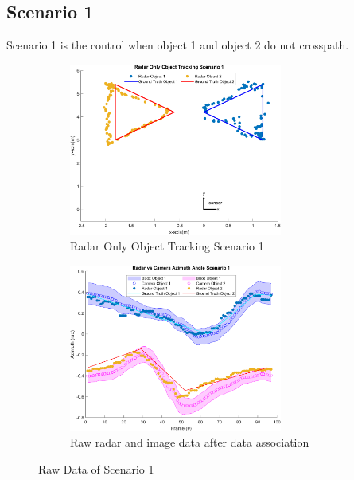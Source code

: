 \subsection{Scenario 1}\label{sec:3-exp_result1}
Scenario 1 is the control when object 1 and object 2 do not crosspath.
\begin{figure}[!htb]
    \hspace{0.1\textwidth}
    \begin{subfigure}[b]{0.3\textwidth}%
        \includegraphics[width=7cm]{Figures/matlab/Radar Only Object Tracking Scenario 1.png}
        \caption{Radar Only Object Tracking Scenario 1}
        \label{subfig:radar_1}
    \end{subfigure}
    \hspace{0.1\textwidth}
    \begin{subfigure}[b]{0.3\textwidth}%
        \includegraphics[width=7cm]{Figures/matlab/Radar vs Camera Azimuth Angle Scenario 1.png}
        \caption{Raw radar and image data after data association}
        \label{subfig:raw_fusion_1}
    \end{subfigure}

    \caption{Raw Data of Scenario 1}
    \label{fig:raw_1}
\end{figure}
